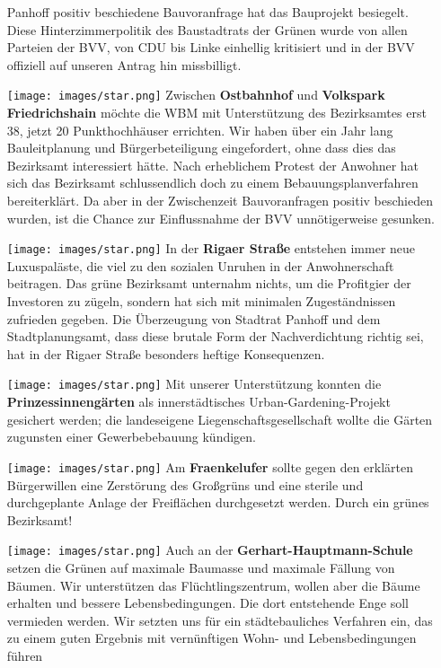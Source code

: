 \documentclass[a4paper,10pt]{article}
\begin{document}
\begin{itemize}
  Panhoff positiv beschiedene Bauvoranfrage hat das Bauprojekt
  besiegelt. Diese Hinterzimmerpolitik des Baustadtrats der Grünen wurde
  von allen Parteien der BVV, von CDU bis Linke einhellig kritisiert und
  in der BVV offiziell auf unseren Antrag hin missbilligt.
\item[\texttt{[image: images/star.png]}]
  Zwischen \textbf{Ostbahnhof} 
  und \textbf{Volkspark Friedrichshain} möchte die
  WBM mit Unterstützung des Bezirksamtes erst 38, jetzt 20
  Punkthochhäuser errichten. Wir haben über ein Jahr lang Bauleitplanung
  und Bürgerbeteiligung eingefordert, ohne dass dies das Bezirksamt
  interessiert hätte. Nach erheblichem Protest der Anwohner hat sich das
  Bezirksamt schlussendlich doch zu einem Bebauungsplanverfahren
  bereiterklärt. Da aber in der Zwischenzeit Bauvoranfragen positiv
  beschieden wurden, ist die Chance zur Einflussnahme der BVV
  unnötigerweise gesunken.
  \enlargethispage{-4em}
\item[\texttt{[image: images/star.png]}]
  In der \textbf{Rigaer Straße} entstehen immer neue Luxuspaläste, die viel
  zu den sozialen Unruhen in der Anwohnerschaft beitragen. Das grüne
  Bezirksamt unternahm nichts, um die Profitgier der Investoren zu
  zügeln, sondern hat sich mit minimalen Zugeständnissen zufrieden
  gegeben. Die Überzeugung von Stadtrat Panhoff und dem
  Stadtplanungsamt, dass diese brutale Form der Nachverdichtung richtig
  sei, hat in der Rigaer Straße besonders heftige Konsequenzen.
\item[\texttt{[image: images/star.png]}]
  Mit unserer Unterstützung konnten die \textbf{Prinzessinnengärten} als
  innerstädtisches Urban-Gardening-Projekt gesichert werden; die
  landeseigene Liegenschaftsgesellschaft wollte die Gärten zugunsten
  einer Gewerbebebauung kündigen.
\item[\texttt{[image: images/star.png]}]
  Am \textbf{Fraenkelufer} sollte gegen den erklärten Bürgerwillen eine
  Zerstörung des Großgrüns und eine sterile und durchgeplante Anlage der
  Freiflächen durchgesetzt werden. Durch ein grünes Bezirksamt!
\item[\texttt{[image: images/star.png]}]
  Auch an der \textbf{Gerhart-Hauptmann-Schule} setzen die Grünen auf
  maximale Baumasse und maximale Fällung von Bäumen. Wir unterstützen
  das Flüchtlingszentrum, wollen aber die Bäume erhalten und bessere
  Lebensbedingungen. Die dort entstehende Enge soll vermieden werden.
  Wir setzten uns für ein städtebauliches Verfahren ein, das zu einem
  guten Ergebnis mit vernünftigen Wohn- und Lebensbedingungen führen

\end{itemize}
\end{document}
